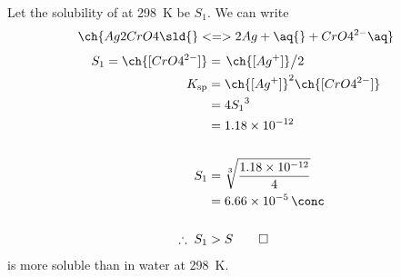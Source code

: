 Let the solubility of  at \qty{298}{\kelvin} be \(S_1\). We can write
\begin{equation}
	\ch{Ag2CrO4 \sld{} <=> 2 Ag+ \aq{} + CrO4^{2-} \aq}
	\label{eq:ag2cro4}
\end{equation}
\begin{align*}
	S_1 = \ch{[CrO4^{2-}]} & = \slf{\ch{[Ag^{+}]}}{2}           \\
	K_{\text{sp}}          & = \ch{[Ag^{+}]}^2 \ch{[CrO4^{2-}]} \\
	                       & = 4{S_1}^3                         \\
	                       & = \num{1.18e-12}                   \\
	\\
	S_1                    & = \sqrt[3]{\f{\num{1.18e-12}}{4}}  \\
	                       & = \qty{6.66e-5}{\conc}             \\
	\\
	\therefore \; S_1      & > S \qed
\end{align*}
{\color{accent}  is more soluble than  in water at \qty{298}{\kelvin}.}
